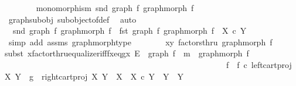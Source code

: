 \begin{isabellebody}
\ \ \ \ \ \ \isamarkupfalse%
\ {\isachardoublequoteopen}monomorphism\ {\isacharparenleft}{\kern0pt}snd\ {\isacharparenleft}{\kern0pt}graph\ f{\isacharcomma}{\kern0pt}\ graph{\isacharunderscore}{\kern0pt}morph\ f{\isacharparenright}{\kern0pt}{\isacharparenright}{\kern0pt}{\isachardoublequoteclose}\isanewline
\ \ \ \ \ \ \ \ \isamarkupfalse%
\ graph{\isacharunderscore}{\kern0pt}subobj\ subobject{\isacharunderscore}{\kern0pt}of{\isacharunderscore}{\kern0pt}def\ \isamarkupfalse%
\ auto\isanewline
\ \ \ \ \ \ \isamarkupfalse%
\ {\isachardoublequoteopen}\ snd\ {\isacharparenleft}{\kern0pt}graph\ f{\isacharcomma}{\kern0pt}\ graph{\isacharunderscore}{\kern0pt}morph\ f{\isacharparenright}{\kern0pt}\ {\isacharcolon}{\kern0pt}\ fst\ {\isacharparenleft}{\kern0pt}graph\ f{\isacharcomma}{\kern0pt}\ graph{\isacharunderscore}{\kern0pt}morph\ f{\isacharparenright}{\kern0pt}\ {\isasymrightarrow}\ X\ {\isasymtimes}\isactrlsub c\ Y{\isachardoublequoteclose}\isanewline
\ \ \ \ \ \ \ \ \isamarkupfalse%
\ {\isacharparenleft}{\kern0pt}simp\ add{\isacharcolon}{\kern0pt}\ assms\ graph{\isacharunderscore}{\kern0pt}morph{\isacharunderscore}{\kern0pt}type{\isacharparenright}{\kern0pt}\isanewline
\ \ \ \ \ \ \isamarkupfalse%
\ {\isachardoublequoteopen}{\isasymlangle}x{\isacharcomma}{\kern0pt}y{\isasymrangle}\ factorsthru\ graph{\isacharunderscore}{\kern0pt}morph\ f{\isachardoublequoteclose}\isanewline
\ \ \ \ \ \ \isamarkupfalse%
{\isacharparenleft}{\kern0pt}subst\ xfactorthru{\isacharunderscore}{\kern0pt}equalizer{\isacharunderscore}{\kern0pt}iff{\isacharunderscore}{\kern0pt}fx{\isacharunderscore}{\kern0pt}eq{\isacharunderscore}{\kern0pt}gx{\isacharbrackleft}{\kern0pt}\ E\ {\isacharequal}{\kern0pt}\ {\isachardoublequoteopen}graph\ f{\isachardoublequoteclose}{\isacharcomma}{\kern0pt}\ \ m\ {\isacharequal}{\kern0pt}\ {\isachardoublequoteopen}graph{\isacharunderscore}{\kern0pt}morph\ f{\isachardoublequoteclose}{\isacharcomma}{\kern0pt}\ \ \isanewline
\ \ \ \ \ \ \ \ \ \ \ \ \ \ \ \ \ \ \ \ \ \ \ \ \ \ \ \ \ \ \ \ \ \ \ \ \ \ \ \ \ \ \ \ \ \ \ \ \ \ \ \ \ \ f\ {\isacharequal}{\kern0pt}\ {\isachardoublequoteopen}{\isacharparenleft}{\kern0pt}f\ {\isasymcirc}\isactrlsub c\ left{\isacharunderscore}{\kern0pt}cart{\isacharunderscore}{\kern0pt}proj\ X\ Y{\isacharparenright}{\kern0pt}{\isachardoublequoteclose}{\isacharcomma}{\kern0pt}\ \ g\ {\isacharequal}{\kern0pt}\ {\isachardoublequoteopen}right{\isacharunderscore}{\kern0pt}cart{\isacharunderscore}{\kern0pt}proj\ X\ Y{\isachardoublequoteclose}{\isacharcomma}{\kern0pt}\ \ X\ {\isacharequal}{\kern0pt}\ {\isachardoublequoteopen}X\ {\isasymtimes}\isactrlsub c\ Y{\isachardoublequoteclose}{\isacharcomma}{\kern0pt}\ \ Y\ {\isacharequal}{\kern0pt}\ Y{\isacharcomma}{\kern0pt}\isanewline

\end{isabellebody}

